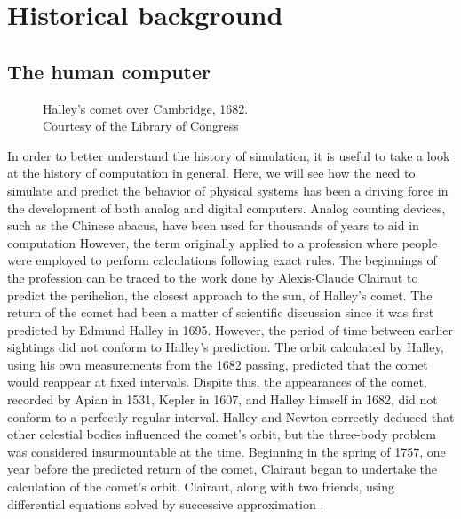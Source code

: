 \documentclass[\rootfolder/main.tex]{subfiles}
\begin{document}
\chapter{Historical background} %

\label{Chapter01} %

\section{The human computer}

\begin{wrapfigure}{R}{0.6\columnwidth}
    \caption[Halley's comet over Cambridge, 1682]
        {Halley's comet over Cambridge, 1682. \\ Courtesy of the Library of Congress\label{fig:comet}}
\end{wrapfigure}

In order to better understand the history of simulation, it is useful to take a look at the history of computation in general.
Here, we will see how the need to simulate and predict the behavior of physical systems has been a driving force in the development of both analog and digital computers.
Analog counting devices, such as the Chinese abacus, have been used for thousands of years to aid in computation
However, the term originally applied to a profession where people were employed to perform calculations following exact rules.
The beginnings of the profession can be traced to the work done by Alexis-Claude Clairaut to predict the perihelion, the closest approach to the sun, of Halley's comet.
The return of the comet had been a matter of scientific discussion since it was first predicted by Edmund Halley in 1695.
However, the period of time between earlier sightings did not conform to Halley's prediction.
The orbit calculated by Halley, using his own measurements from the 1682 passing, predicted that the comet would reappear at fixed intervals.
Dispite this, the appearances of the comet, recorded by Apian in 1531, Kepler in 1607, and Halley himself in 1682, did not conform to a perfectly regular interval.
Halley and Newton correctly deduced that other celestial bodies influenced the comet's orbit, but the three-body problem was considered insurmountable at the time.
Beginning in the spring of 1757, one year before the predicted return of the comet, Clairaut began to undertake the calculation of the comet's orbit.
Clairaut, along with two friends, using differential equations solved by successive approximation \cite{wilson1993}.
\end{document}
